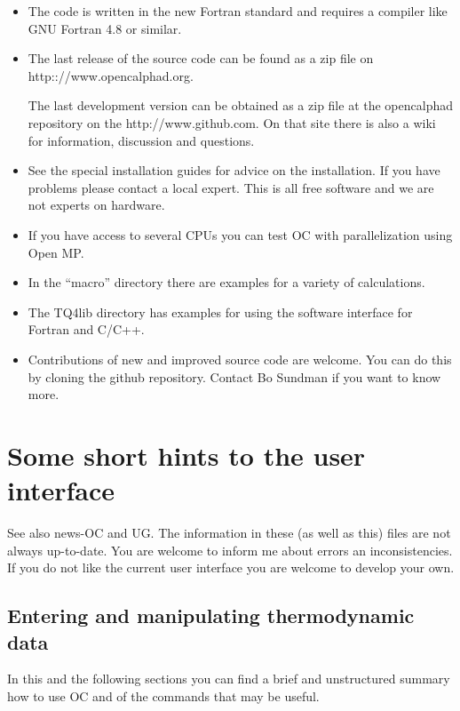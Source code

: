 \documentclass[12pt]{article}
\begin{document}
\begin{itemize}
\item The code is written in the new Fortran standard and requires a
  compiler like GNU Fortran 4.8 or similar.

\item The last release of the source code can be found as a zip file
  on http:://www.opencalphad.org.

  The last development version can be obtained as a zip file at the
  opencalphad repository on the http://www.github.com.  On that site
  there is also a wiki for information, discussion and questions.

\item See the special installation guides for advice on the
  installation.  If you have problems please contact a local expert.
  This is all free software and we are not experts on hardware.

\item If you have access to several CPUs you can test OC with
  parallelization using Open MP.

\item In the ``macro'' directory there are examples for a variety of
  calculations.

\item The TQ4lib directory has examples for using the software
  interface for Fortran and C/C++.

\item Contributions of new and improved source code are welcome.  You
  can do this by cloning the github repository.  Contact Bo Sundman if
  you want to know more.
\end{itemize}

\section{Some short hints to the user interface}

See also news-OC and UG.  The information in these (as well as this)
files are not always up-to-date.  You are welcome to inform me about
errors an inconsistencies.  If you do not like the current user
interface you are welcome to develop your own.

\subsection{Entering and manipulating thermodynamic data}

In this and the following sections you can find a brief and
unstructured summary how to use OC and of the commands that may be
useful.
\end{document}
